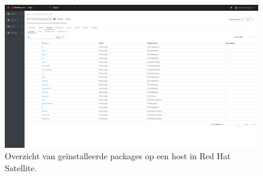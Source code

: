 \begin{figure}[h!]
    \includegraphics[width=\textwidth]
    {./graphics/state-of-the-art/rhel-satellite/rhel-sat-host-pkgs.png}
    \caption{\label{fig:rhel-sat-host-pkgs}Overzicht van ge\"{i}nstalleerde packages op een host in Red Hat Satellite.}
\end{figure}
